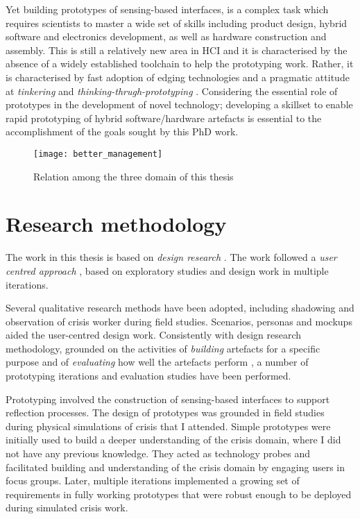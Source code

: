 Yet building prototypes of sensing-based interfaces, is a complex task which requires scientists to master a wide set of skills including product design, hybrid software and electronics development, as well as hardware construction and assembly. This is still a relatively new area in HCI and it is characterised by the absence of a widely established toolchain to help the prototyping work. Rather, it is characterised by fast adoption of edging technologies and a pragmatic attitude at \emph{tinkering} and \emph{thinking-thrugh-prototyping} \autocite{Klemmer:2006ez}. Considering the essential role of prototypes in the development of novel technology; developing a skillset to enable rapid prototyping of hybrid software/hardware artefacts is essential to the accomplishment of the goals sought by this PhD work.

\begin{figure}
	[tbh] \centering 
	\texttt{[image: better\_management]} \caption{Relation among the three domain of this thesis} \label{fig:topic_relation} 
\end{figure}

\section{Research methodology}\label{research-methodology}

The work in this thesis is based on \emph{design research} \autocites{Hevner:2010gc}{March:1995gm}. The work followed a \emph{user centred approach} \autocites{MAGUIRE:2001dp}{Gulliksen:2003hd}, based on exploratory studies and design work in multiple iterations.

Several qualitative research methods \autocite{robson1993real} have been adopted, including shadowing and observation of crisis worker during field studies. Scenarios, personas and mockups aided the user-centred design work. Consistently with design research methodology, grounded on the activities of \emph{building} artefacts for a specific purpose and of \emph{evaluating} how well the artefacts perform \autocite{March:1995gm}, a number of prototyping iterations and evaluation studies have been performed.

Prototyping involved the construction of sensing-based interfaces to support reflection processes. The design of prototypes was grounded in field studies during physical simulations of crisis that I attended. Simple prototypes were initially used to build a deeper understanding of the crisis domain, where I did not have any previous knowledge. They acted as technology probes \autocite{Hutchinson:2003il} and facilitated building and understanding of the crisis domain by engaging users in focus groups. Later, multiple iterations implemented a growing set of requirements in fully working prototypes that were robust enough to be deployed during simulated crisis work.

